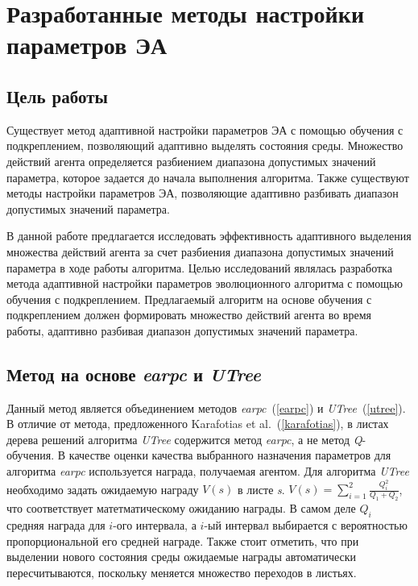 \chapter{Разработанные методы настройки параметров ЭА}
\label{proposed_chapter}
\section{Цель работы}
Существует метод адаптивной настройки параметров ЭА с помощью обучения с подкреплением, позволяющий адаптивно выделять состояния среды. Множество действий агента определяется разбиением диапазона допустимых значений параметра, которое задается до начала выполнения алгоритма. Также существуют методы настройки параметров ЭА, позволяющие адаптивно разбивать диапазон допустимых значений параметра.

В данной работе предлагается исследовать эффективность адаптивного выделения множества действий агента за счет разбиения диапазона допустимых значений параметра в ходе работы алгоритма. Целью исследований являлась разработка метода адаптивной настройки параметров эволюционного алгоритма с помощью обучения с подкреплением. Предлагаемый алгоритм на основе обучения с подкреплением должен формировать множество действий агента во время работы, адаптивно разбивая диапазон допустимых значений параметра.

\section{Метод на основе \textit{earpc} и \textit{UTree}}
\label{composing_method}
Данный метод является объединением методов \textit{earpc}~(\ref{earpc}) и \textit{UTree}~(\ref{utree}). В отличие от метода, предложенного Karafotias et al.~(\ref{karafotias}), в листах дерева решений алгоритма \textit{UTree} содержится метод \textit{earpc}, а не метод \textit{Q}-обучения. В качестве оценки качества выбранного назначения параметров для алгоритма \textit{earpc} используется награда, получаемая агентом. Для алгоритма \textit{UTree} необходимо задать ожидаемую награду $V(s)$ в листе \textit{s}. $V(s) = \sum\limits_{i = 1}^2{\frac{Q_i^2}{Q_1 + Q_2}}$, что соответствует матетматическому ожиданию награды. В самом деле $Q_i$ средняя награда для $i$-ого интервала, а $i$-ый интервал выбирается с вероятностью пропорциональной его средней награде. Также стоит отметить, что при выделении нового состояния среды ожидаемые награды автоматически пересчитываются, поскольку меняется множество переходов в листьях.

